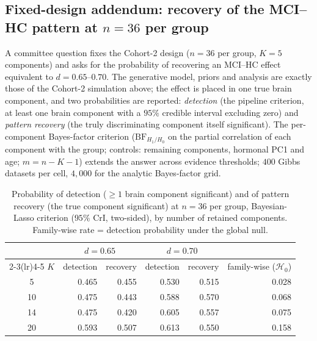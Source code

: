 \documentclass[11pt,a4paper]{article}
\newcommand{\BF}{\mathrm{BF}}
\begin{document}
\subsection{Fixed-design addendum: recovery of the MCI--HC pattern at $n=36$ per group}

A committee question fixes the Cohort-2 design ($n=36$ per group, $K=5$ components) and asks for the probability of recovering an MCI--HC effect equivalent to $d=0.65$--$0.70$. The generative model, priors and analysis are exactly those of the Cohort-2 simulation above; the effect is placed in one true brain component, and two probabilities are reported: \emph{detection} (the pipeline criterion, at least one brain component with a $95\%$ credible interval excluding zero) and \emph{pattern recovery} (the truly discriminating component itself significant). The per-component Bayes-factor criterion ($\BF_{H_1/H_0}$ on the partial correlation of each component with the group; controls: remaining components, hormonal PC1 and age; $m=n-K-1$) extends the answer across evidence thresholds; $400$ Gibbs datasets per cell, $4{,}000$ for the analytic Bayes-factor grid.

\begin{table}[H]
\centering\small
\caption{Probability of detection ($\ge1$ brain component significant) and of pattern recovery (the true component significant) at $n=36$ per group, Bayesian-Lasso criterion ($95\%$ CrI, two-sided), by number of retained components. Family-wise rate = detection probability under the global null.}
\label{tab:focal}
\begin{tabular}{crrrrr}
\toprule
 & \multicolumn{2}{c}{$d=0.65$} & \multicolumn{2}{c}{$d=0.70$} & \\
\cmidrule(lr){2-3}\cmidrule(lr){4-5}
$K$ & detection & recovery & detection & recovery & family-wise ($\mathcal{H}_0$)\\
\midrule
\rowcolor{RowGrey}
5 & 0.465 & 0.455 & 0.530 & 0.515 & 0.028\\
10 & 0.475 & 0.443 & 0.588 & 0.570 & 0.068\\
14 & 0.475 & 0.420 & 0.605 & 0.557 & 0.075\\
20 & 0.593 & 0.507 & 0.613 & 0.550 & 0.158\\
\bottomrule
\end{tabular}
\end{table}
\end{document}
